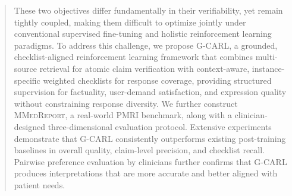 \documentclass[letterpaper]{article} %
\begin{document}
\begin{abstract}
These two objectives differ fundamentally in their verifiability, yet remain tightly coupled, making them difficult to optimize jointly under conventional supervised fine-tuning and holistic reinforcement learning paradigms.
To address this challenge, we propose G-CARL, a grounded, checklist-aligned reinforcement learning framework that combines multi-source retrieval for atomic claim verification with context-aware, instance-specific weighted checklists for response coverage, providing structured supervision for factuality, user-demand satisfaction, and expression quality without constraining response diversity.
We further construct \textsc{MMedReport}, a real-world PMRI benchmark, along with a clinician-designed three-dimensional evaluation protocol. Extensive experiments demonstrate that G-CARL consistently outperforms existing post-training baselines in overall quality, claim-level precision, and checklist recall. Pairwise preference evaluation by clinicians further confirms that G-CARL produces interpretations that are more accurate and better aligned with patient needs.
\end{abstract}


\end{document}
